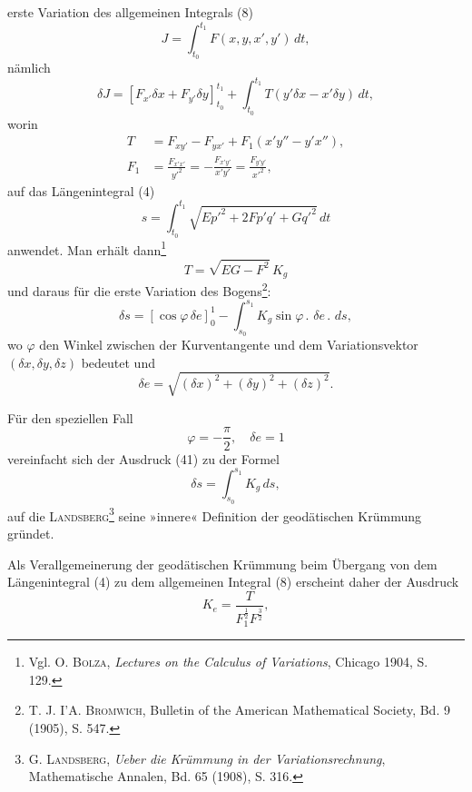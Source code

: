 erste Variation des allgemeinen Integrals (8)
\begin{equation*}\tag{8}
J=\int_{t_0}^{t_1}F(x,y,x',y')\,dt,
\end{equation*}
nämlich
\[
\delta J=[F_{x'}\delta x+F_{y'}\delta y]_{t_0}^{t_1}+\int_{t_0}^{t_1}T(y'\delta x-x'\delta y)\,dt,
\]
worin
\[
\begin{aligned}
T&=F_{xy'}-F_{yx'}+F_1(x'y''-y'x''),\\
F_1&=\frac{F_{x'x'}}{y'^2}=-\frac{F_{x'y'}}{x'y'}=\frac{F_{y'y'}}{x'^2},
\end{aligned}
\]
auf das Längenintegral (4)
\begin{equation*}\tag{4}
s=\int_{t_0}^{t_1}\sqrt{Ep'^2+2Fp'q'+Gq'^2}\,dt
\end{equation*}
\clearpage{}
\noindent anwendet. Man erhält dann\footnote{Vgl. O. \textsc{Bolza}, \textit{Lectures on the Calculus of Variations}, Chicago 1904, S. 129.}
\[
T=\sqrt{EG-F^2}\,K_g
\]
und daraus für die erste Variation des Bogens\footnote{T. J. I'A. \textsc{Bromwich}, Bulletin of the American Mathematical Society, Bd. 9 (1905), S. 547.}:
\begin{equation*}\tag{41}
\delta s=[\cos\varphi\,\delta e]_0^1-\int_{s_0}^{s_1}K_g\sin\varphi\mathpunct{.}\,\delta e\mathpunct{.}\,ds,
\end{equation*}
wo $\varphi$ den Winkel zwischen der Kurventangente und dem Variationsvektor
$(\delta x,\delta y,\delta z)$ bedeutet und
\[
\delta e=\sqrt{(\delta x)^2+(\delta y)^2+(\delta z)^2}.
\]
\par\noindent\hspace*{\parindent}Für den speziellen Fall
\[
\varphi=-\frac{\pi}{2},\quad\delta e=1
\]
vereinfacht sich der Ausdruck (41) zu der Formel
\begin{equation*}\tag{42}
\delta s=\int_{s_0}^{s_1}K_g\,ds,
\end{equation*}
auf die \textsc{Landsberg}\footnote{G. \textsc{Landsberg}, \textit{Ueber die Krümmung in der Variationsrechnung}, Mathematische Annalen, Bd. 65
(1908), S. 316.} seine »innere« Definition der geodätischen Krümmung
gründet.
\par\noindent\hspace*{\parindent}Als Verallgemeinerung der geodätischen Krümmung beim Übergang von
dem Längenintegral (4) zu dem allgemeinen Integral (8) erscheint daher der
Ausdruck
\begin{equation*}\tag{43}
K_e=\frac{T}{F_1^{\frac12}F^{\frac32}},
\end{equation*}
